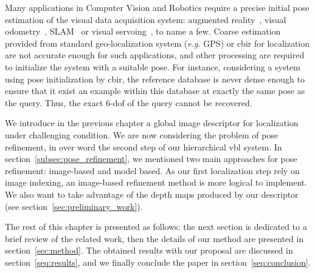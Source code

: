 Many applications in Computer Vision and Robotics require a precise initial pose estimation of the visual data acquisition system: augmented reality~\citep{Arth2015}, visual odometry~\citep{Pascoe2015a}, SLAM~\citep{Milford2012} or visual servoing~\citep{Marchand2016}, to name a few. Coarse estimation provided from standard geo-localization system (\textit{e.g.} GPS) or \ac{cbir} for localization are not accurate enough for such applications, and other processing are required to initialize the system with a suitable pose. For instance, considering a system using pose initialization by \ac{cbir}, the reference database is never dense enough to ensure that it exist an example within this database at exactly the same pose as the query. Thus, the exact 6-\ac{dof} of the query cannot be recovered.

We introduce in the previous chapter a global image descriptor for localization under challenging condition. We are now considering the problem of pose refinement, in over word the second step of our hierarchical \ac{vbl} system. In section~\ref{subsec:pose_refinement}, we mentioned two main approaches for pose refinement: image-based and model based. As our first localization step rely on image indexing, an image-based refinement method is more logical to implement. We also want to take advantage of the depth maps produced by our descriptor (see section~\ref{sec:preliminary_work}).



The rest of this chapter is presented as follows: the next section is dedicated to a brief review of the related work, then the details of our method are presented in section~\ref{sec:method}. The obtained results with our proposal are discussed in section~\ref{seq:results}, and we finally conclude the paper in section~\ref{seq:conclusion}.
